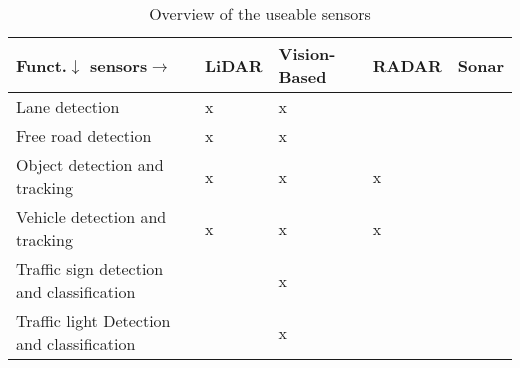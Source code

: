 \begin{table}[htbp]
\begin{tabularx}{\textwidth}{ |p{7cm}|Y|Y|Y|Y| }
\hline
Funct.$\downarrow$ sensors$\rightarrow$ & LiDAR & Vision-Based & RADAR & Sonar \\
\hline \hline
Lane detection & 
x & x &  &  \\
\hline
Free road detection & 
x & x &  &  \\
\hline
Object detection and tracking & 
x & x & x &  \\
\hline
Vehicle detection and tracking  & 
x & x & x &  \\
\hline
Traffic sign detection and classification  & 
 & x &  &  \\
\hline
Traffic light Detection and classification&
 & x &  &  \\
\hline
\end{tabularx}
\caption{Overview of the useable sensors}
\label{table:useable_sensors}
\end{table}